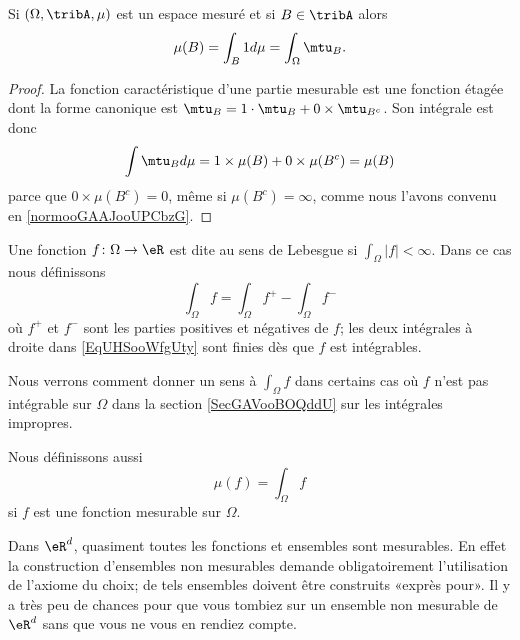 \begin{lemma}       \label{LemooPJLNooVKrBhN}
    Si \( (\Omega,\tribA,\mu)\) est un espace mesuré et si \( B\in \tribA\) alors
    \begin{equation}
        \mu(B)=\int_B1d\mu=\int_{\Omega}\mtu_B.
    \end{equation}
\end{lemma}

\begin{proof}
    La fonction caractéristique d'une partie mesurable est une fonction étagée dont la forme canonique est \( \mtu_B=1\cdot \mtu_B+0\times \mtu_{B^c}\). Son intégrale est donc
    \begin{equation}
        \int\mtu_Bd\mu=1\times \mu(B)+0\times \mu(B^c)=\mu(B)
    \end{equation}
    parce que \( 0\times \mu(B^c)=0\), même si \( \mu(B^c)=\infty\), comme nous l'avons convenu en \ref{normooGAAJooUPCbzG}.
\end{proof}

\begin{definition}  \label{DefTCXooAstMYl}
    Une fonction \( f\colon \Omega\to \eR\) est dite  au sens de Lebesgue si \( \int_{\Omega}| f |<\infty\). Dans ce cas nous définissons
    \begin{equation}    \label{EqUHSooWfgUty}
        \int_{\Omega}f=\int_{\Omega}f^+-\int_{\Omega}f^-
    \end{equation}
    où \( f^+\) et \( f^-\) sont les parties positives et négatives de \( f\); les deux intégrales à droite dans \eqref{EqUHSooWfgUty} sont finies dès que \( f\) est intégrables.
\end{definition}
Nous verrons comment donner un sens à \( \int_{\Omega}f\) dans certains cas où \( f\) n'est pas intégrable sur \( \Omega\) dans la section \ref{SecGAVooBOQddU} sur les intégrales impropres.

Nous définissons aussi
\begin{equation}
    \mu(f)=\int_{\Omega}f
\end{equation}
si \( f\) est une fonction mesurable sur \( \Omega\).

\begin{remark}
    Dans \( \eR^d\), quasiment toutes les fonctions et ensembles sont mesurables. En effet la construction d'ensembles non mesurables demande obligatoirement l'utilisation de l'axiome du choix; de tels ensembles doivent être construits «exprès pour». Il y a très peu de chances pour que vous tombiez sur un ensemble non mesurable de \( \eR^d\) sans que vous ne vous en rendiez compte.
\end{remark}

